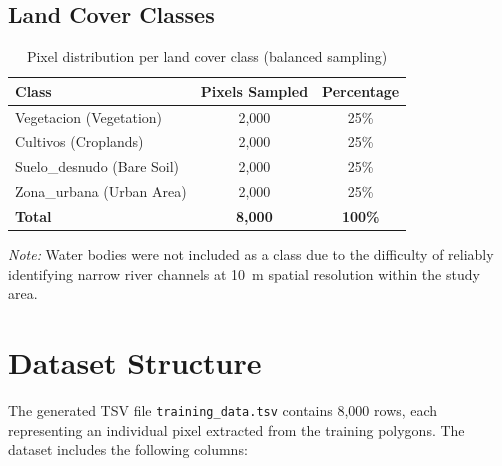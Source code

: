 \documentclass[12pt,a4paper]{article}
\begin{document}
\subsection{Land Cover Classes}

\begin{table}[H]
\centering
\begin{tabular}{|m{5cm}|c|c|}
\hline
\textbf{Class} & \textbf{Pixels Sampled} & \textbf{Percentage} \\
\hline
Vegetacion (Vegetation) & 2,000 & 25\% \\
\hline
Cultivos (Croplands) & 2,000 & 25\% \\
\hline
Suelo\_desnudo (Bare Soil) & 2,000 & 25\% \\
\hline
Zona\_urbana (Urban Area) & 2,000 & 25\% \\
\hline
\textbf{Total} & \textbf{8,000} & \textbf{100\%} \\
\hline
\end{tabular}
\caption{Pixel distribution per land cover class (balanced sampling)}
\end{table}

\noindent\textit{Note:} Water bodies were not included as a class due to the difficulty of reliably identifying narrow river channels at 10~m spatial resolution within the study area.

\section{Dataset Structure}

The generated TSV file \texttt{training\_data.tsv} contains 8,000 rows, each representing an individual pixel extracted from the training polygons. The dataset includes the following columns:
\end{document}
